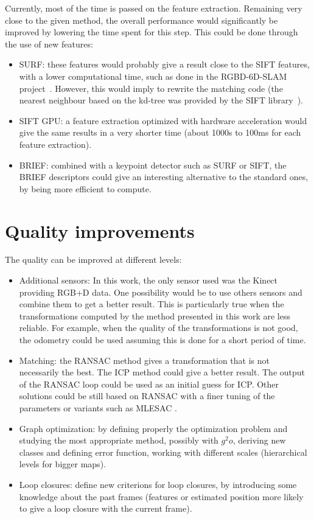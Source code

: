 Currently, most of the time is passed on the feature extraction. Remaining very close to the given method, the overall performance would significantly be improved by lowering the time spent for this step. This could be done through the use of new features:
\begin{itemize}
\item SURF: these features would probably give a result close to the SIFT features, with a lower computational time, such as done in the RGBD-6D-SLAM project~\cite{engelhard11euron-workshop}. However, this would imply to rewrite the matching code (the nearest neighbour based on the kd-tree was provided by the SIFT library~\cite{hess_sift}).
\item SIFT GPU: a feature extraction optimized with hardware acceleration would give the same results in a very shorter time (about 1000s to 100ms for each feature extraction).
\item BRIEF: combined with a keypoint detector such as SURF or SIFT, the BRIEF descriptors\cite{Calonder10-brief} could give an interesting alternative to the standard ones, by being more efficient to compute.
\end{itemize}

\section{Quality improvements}

The quality can be improved at different levels:
\begin{itemize}
\item Additional sensors: In this work, the only sensor used was the Kinect providing RGB+D data. One possibility would be to use others sensors and combine them to get a better result. This is particularly true when the transformations computed by the method presented in this work are less reliable. For example, when the quality of the transformations is not good, the odometry could be used assuming this is done for a short period of time.
\item Matching: the RANSAC method gives a transformation that is not necessarily the best. The ICP \cite{zhang_92_icp} method could give a better result. The output of the RANSAC loop could be used as an initial guess for ICP. Other solutions could be still based on RANSAC with a finer tuning of the parameters or variants such as MLESAC \cite{TorrZ00}.
\item Graph optimization: by defining properly the optimization problem and studying the most appropriate method, possibly with $g^2o$, deriving new classes and defining error function, working with different scales (hierarchical levels for bigger maps).
\item Loop closures: define new criterions for loop closures, by introducing some knowledge about the past frames (features or estimated position more likely to give a loop closure with the current frame).
\end{itemize}

